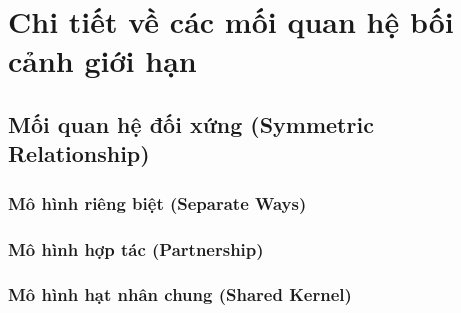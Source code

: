 \documentclass{report} %
\begin{document}
% 


% 


% 


% 

\section{Chi tiết về các mối quan hệ bối cảnh giới hạn}



\subsection{Mối quan hệ đối xứng (Symmetric Relationship)}

\subsubsection{Mô hình riêng biệt (Separate Ways)}



% 

\subsubsection{Mô hình hợp tác (Partnership)}

% 

\subsubsection{Mô hình hạt nhân chung (Shared Kernel)}
\end{document}
